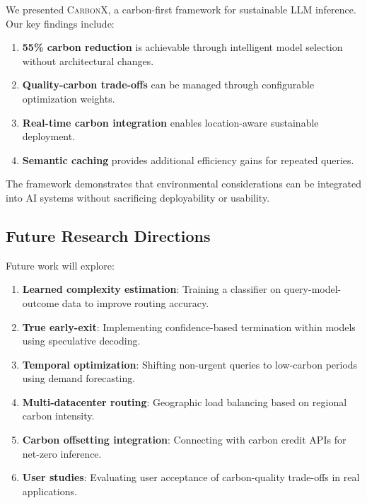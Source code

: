 \documentclass[conference]{IEEEtran}
\newcommand{\carbonx}{\textsc{CarbonX}}
\begin{document}
We presented \carbonx{}, a carbon-first framework for sustainable LLM inference. Our key findings include:

\begin{enumerate}
    \item \textbf{55\% carbon reduction} is achievable through intelligent model selection without architectural changes.
    \item \textbf{Quality-carbon trade-offs} can be managed through configurable optimization weights.
    \item \textbf{Real-time carbon integration} enables location-aware sustainable deployment.
    \item \textbf{Semantic caching} provides additional efficiency gains for repeated queries.
\end{enumerate}

The framework demonstrates that environmental considerations can be integrated into AI systems without sacrificing deployability or usability.

\subsection{Future Research Directions}

Future work will explore:

\begin{enumerate}
    \item \textbf{Learned complexity estimation}: Training a classifier on query-model-outcome data to improve routing accuracy.
    
    \item \textbf{True early-exit}: Implementing confidence-based termination within models using speculative decoding.
    
    \item \textbf{Temporal optimization}: Shifting non-urgent queries to low-carbon periods using demand forecasting.
    
    \item \textbf{Multi-datacenter routing}: Geographic load balancing based on regional carbon intensity.
    
    \item \textbf{Carbon offsetting integration}: Connecting with carbon credit APIs for net-zero inference.
    
    \item \textbf{User studies}: Evaluating user acceptance of carbon-quality trade-offs in real applications.
\end{enumerate}
\end{document}
